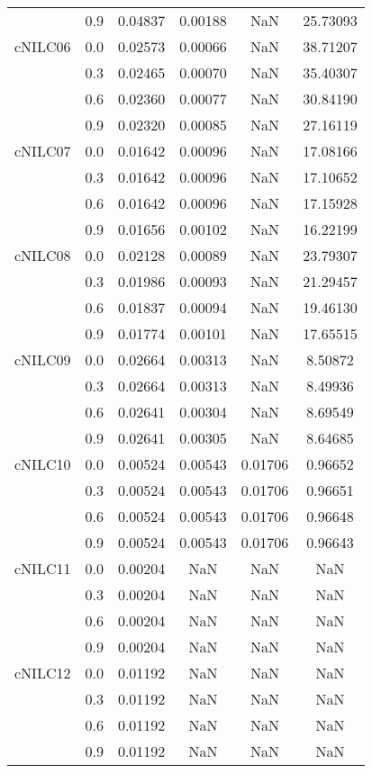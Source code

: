 \begin{longtable}{cccccc}
        & 0.9 & 0.04837 & 0.00188 & NaN & 25.73093 \\
cNILC06 & 0.0 & 0.02573 & 0.00066 & NaN & 38.71207 \\
        & 0.3 & 0.02465 & 0.00070 & NaN & 35.40307 \\
        & 0.6 & 0.02360 & 0.00077 & NaN & 30.84190 \\
        & 0.9 & 0.02320 & 0.00085 & NaN & 27.16119 \\
cNILC07 & 0.0 & 0.01642 & 0.00096 & NaN & 17.08166 \\
        & 0.3 & 0.01642 & 0.00096 & NaN & 17.10652 \\
        & 0.6 & 0.01642 & 0.00096 & NaN & 17.15928 \\
        & 0.9 & 0.01656 & 0.00102 & NaN & 16.22199 \\
cNILC08 & 0.0 & 0.02128 & 0.00089 & NaN & 23.79307 \\
        & 0.3 & 0.01986 & 0.00093 & NaN & 21.29457 \\
        & 0.6 & 0.01837 & 0.00094 & NaN & 19.46130 \\
        & 0.9 & 0.01774 & 0.00101 & NaN & 17.65515 \\
cNILC09 & 0.0 & 0.02664 & 0.00313 & NaN & 8.50872 \\
        & 0.3 & 0.02664 & 0.00313 & NaN & 8.49936 \\
        & 0.6 & 0.02641 & 0.00304 & NaN & 8.69549 \\
        & 0.9 & 0.02641 & 0.00305 & NaN & 8.64685 \\
cNILC10 & 0.0 & 0.00524 & 0.00543 & 0.01706 & 0.96652 \\
        & 0.3 & 0.00524 & 0.00543 & 0.01706 & 0.96651 \\
        & 0.6 & 0.00524 & 0.00543 & 0.01706 & 0.96648 \\
        & 0.9 & 0.00524 & 0.00543 & 0.01706 & 0.96643 \\
cNILC11 & 0.0 & 0.00204 & NaN & NaN & NaN \\
        & 0.3 & 0.00204 & NaN & NaN & NaN \\
        & 0.6 & 0.00204 & NaN & NaN & NaN \\
        & 0.9 & 0.00204 & NaN & NaN & NaN \\
cNILC12 & 0.0 & 0.01192 & NaN & NaN & NaN \\
        & 0.3 & 0.01192 & NaN & NaN & NaN \\
        & 0.6 & 0.01192 & NaN & NaN & NaN \\
        & 0.9 & 0.01192 & NaN & NaN & NaN \\

\end{longtable}

